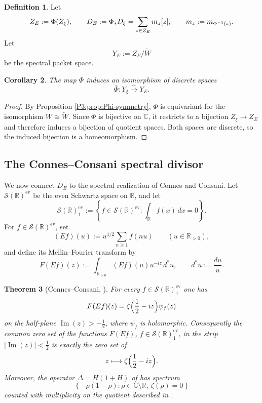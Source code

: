 \documentclass[11pt,a4paper]{article}
\numberwithin{equation}{section}
\newtheorem{theorem}{Theorem}[section]
\newtheorem{corollary}[theorem]{Corollary}
\theoremstyle{definition}
\newtheorem{definition}[theorem]{Definition}
\theoremstyle{remark}
\DeclareMathOperator{\Ima}{Im}
\newcommand{\RR}{\mathbb R}
\newcommand{\CC}{\mathbb C}
\newcommand{\cS}{\mathcal S}
\begin{document}
\begin{definition}
Let
\[
Z_E:=\Phi(Z_\xi),
\qquad
D_E:=\Phi_*D_\xi=\sum_{z\in Z_E} m_z[z],
\\\qquad m_z:=m_{\Phi^{-1}(z)}.
\]
Let
\[
Y_E:=Z_E/\widetilde W
\]
be the spectral packet space.
\end{definition}

\begin{corollary}\label{P3:cor:packet-space-iso}
The map $\Phi$ induces an isomorphism of discrete spaces
\[
\bar\Phi:Y_\xi\stackrel{\sim}{\longrightarrow} Y_E.
\]
\end{corollary}

\begin{proof}
By Proposition \ref{P3:prop:Phi-symmetry}, $\Phi$ is equivariant for the isomorphism $W\cong\widetilde W$.  Since $\Phi$ is bijective on $\CC$, it restricts to a bijection $Z_\xi\to Z_E$ and therefore induces a bijection of quotient spaces.  Both spaces are discrete, so the induced bijection is a homeomorphism.
\end{proof}

\subsection{The Connes--Consani spectral divisor}

We now connect $D_E$ to the spectral realization of Connes and Consani.  Let $\cS(\RR)^{\mathrm{ev}}$ be the even Schwartz space on $\RR$, and let
\[
\cS(\RR)^{\mathrm{ev}}_1:=\left\{f\in\cS(\RR)^{\mathrm{ev}}: \int_{\RR} f(x)\,dx=0\right\}.
\]
For $f\in\cS(\RR)^{\mathrm{ev}}$, set
\[
(Ef)(u):=u^{1/2}\sum_{n\ge1} f(nu)
\qquad (u\in\RR_{>0}),
\]
and define its Mellin--Fourier transform by
\[
F(Ef)(z):=\int_{\RR_{>0}} (Ef)(u)u^{-iz}\,d^*u,
\qquad d^*u:=\frac{du}{u}.
\]

\begin{theorem}[Connes--Consani, \cite{ConnesConsaniCycles}]\label{P3:thm:Connes-CC}
For every $f\in \cS(\RR)^{\mathrm{ev}}_1$ one has
\[
F(Ef)(z)=\zeta\Bigl(\frac12-iz\Bigr)\psi_f(z)
\]
on the half-plane $\Ima(z)>-\frac12$, where $\psi_f$ is holomorphic.  Consequently the common zero set of the functions $F(Ef)$, $f\in\cS(\RR)^{\mathrm{ev}}_1$, in the strip $|\Ima(z)|<\frac12$ is exactly the zero set of
\[
z\longmapsto \zeta\Bigl(\frac12-iz\Bigr).
\]
Moreover, the operator $\Delta=H(1+H)$ of \cite[Section~4]{ConnesConsaniCycles} has spectrum
\[
\left\{-\rho(1-\rho):\rho\in\CC\setminus\RR,\ \zeta(\rho)=0\right\}
\]
counted with multiplicity on the quotient described in \cite[Proposition~4.2]{ConnesConsaniCycles}.
\end{theorem}
\end{document}
